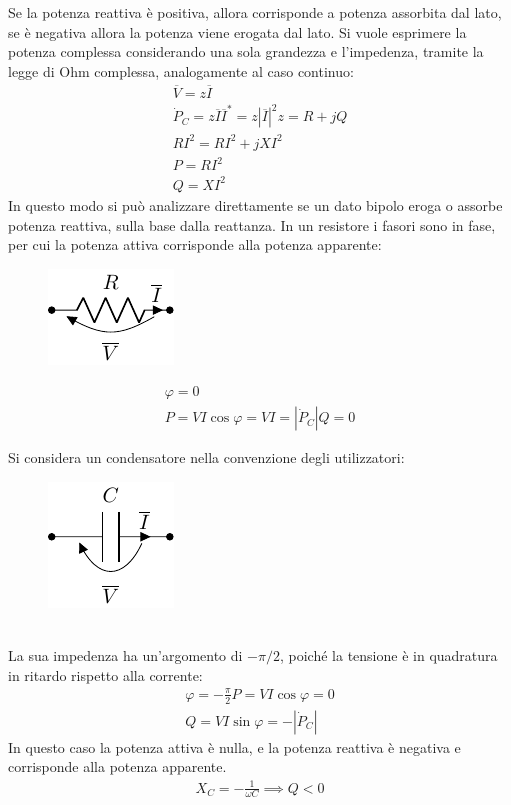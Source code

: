 \documentclass{article}
\numberwithin{equation}{subsection}
\begin{document}
Se la potenza reattiva è positiva, allora corrisponde a potenza assorbita dal lato, se è negativa allora la potenza viene erogata dal lato. Si vuole esprimere la 
potenza complessa considerando una sola grandezza e l'impedenza, tramite la legge di Ohm complessa, analogamente al caso continuo:
\begin{gather*}
    \overline{V}=z\overline{I}\\
    \dot P_C=z\overline{I}\overline{I}^*=z|\overline{I}|^2
    z=R+jQ\\
    RI^2=RI^2+jXI^2\\
    P=RI^2\\
    Q=XI^2
\end{gather*}
In questo modo si può analizzare direttamente se un dato bipolo eroga o assorbe potenza reattiva, sulla base dalla reattanza. 
In un resistore i fasori sono in fase, per cui la potenza attiva corrisponde alla potenza apparente:
\begin{figure}[ht]%
    \centering
    \includegraphics{resistore-fasori.pdf}
\end{figure}
\begin{gather*}
    \varphi=0\\
    P=VI\cos\varphi=VI=|\dot P_C|
    Q=0
\end{gather*}

Si considera un condensatore nella convenzione degli utilizzatori: 
\begin{figure}[ht]%
    \centering
    \includegraphics{condensatore-fasori.pdf}
\end{figure}
\\
La sua impedenza ha un'argomento di $-\pi/2$, poiché la tensione è in quadratura in ritardo rispetto alla corrente:
\begin{gather*}
    \varphi=\displaystyle-\frac{\pi}{2}
    P=VI\cos\varphi=0\\
    Q=VI\sin\varphi=-|\dot P_C|
\end{gather*}
In questo caso la potenza attiva è nulla, e la potenza reattiva è negativa e corrisponde alla potenza apparente. 
\begin{gather*}
    X_C=\displaystyle-\frac{1}{\omega C}\implies Q<0
\end{gather*} 
\end{document}
